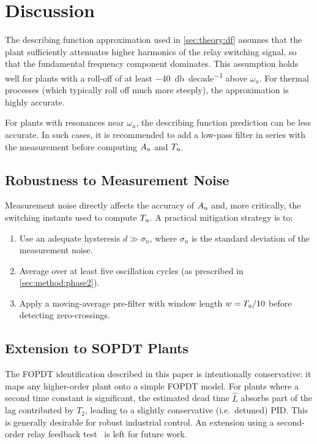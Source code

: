 \section{Discussion}
\label{sec:discussion}

The describing function approximation used in \cref{sec:theory:df} assumes
that the plant sufficiently attenuates higher harmonics of the relay switching
signal, so that the fundamental frequency component dominates.
This assumption holds well for plants with a roll-off of at least
\SI{-40}{\decibel\per decade} above $\omega_u$.
For thermal processes (which typically roll off much more steeply), the
approximation is highly accurate.

For plants with resonances near $\omega_u$, the describing function prediction
can be less accurate.
In such cases, it is recommended to add a low-pass filter in series with the
measurement before computing $A_{\mathrm{u}}$ and $T_{\mathrm{u}}$.

\subsection{Robustness to Measurement Noise}
\label{sec:disc:noise}

Measurement noise directly affects the accuracy of $A_{\mathrm{u}}$ and, more critically,
the switching instants used to compute $T_{\mathrm{u}}$.
A practical mitigation strategy is to:
\begin{enumerate}
    \item Use an adequate hysteresis $d \gg \sigma_n$, where $\sigma_n$ is
          the standard deviation of the measurement noise.
    \item Average over at least five oscillation cycles (as prescribed in
          \cref{sec:method:phase2}).
    \item Apply a moving-average pre-filter with window length
          $w = T_{\mathrm{u}} / 10$ before detecting zero-crossings.
\end{enumerate}

\subsection{Extension to SOPDT Plants}
\label{sec:disc:sopdt}

The FOPDT identification described in this paper is intentionally conservative:
it maps any higher-order plant onto a simple FOPDT model.
For plants where a second time constant is significant, the estimated dead time $\hat{L}$ absorbs part of the
lag contributed by $T_2$, leading to a slightly conservative (i.e.\
detuned) PID.
This is generally desirable for robust industrial control.
An extension using a second-order relay feedback test~\cite{Wang1999}
is left for future work.


